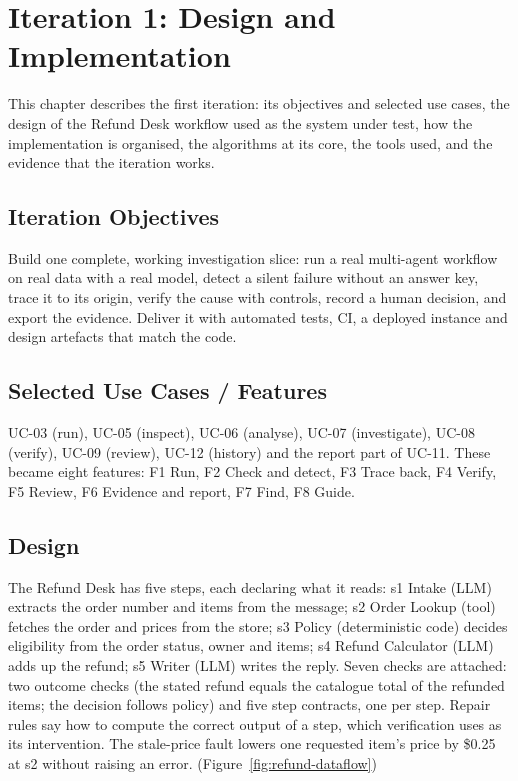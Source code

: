 \chapter{Iteration 1: Design and Implementation}

This chapter describes the first iteration: its objectives and selected use cases, the design of the Refund Desk workflow used as the system under test, how the implementation is organised, the algorithms at its core, the tools used, and the evidence that the iteration works.

\section{Iteration Objectives}

Build one complete, working investigation slice: run a real multi-agent workflow on real data with a real model, detect a silent failure without an answer key, trace it to its origin, verify the cause with controls, record a human decision, and export the evidence. Deliver it with automated tests, CI, a deployed instance and design artefacts that match the code.

\section{Selected Use Cases / Features}

UC-03 (run), UC-05 (inspect), UC-06 (analyse), UC-07 (investigate), UC-08 (verify), UC-09 (review), UC-12 (history) and the report part of UC-11. These became eight features: F1 Run, F2 Check and detect, F3 Trace back, F4 Verify, F5 Review, F6 Evidence and report, F7 Find, F8 Guide.

\section{Design}

The Refund Desk has five steps, each declaring what it reads: s1 Intake (LLM) extracts the order number and items from the message; s2 Order Lookup (tool) fetches the order and prices from the store; s3 Policy (deterministic code) decides eligibility from the order status, owner and items; s4 Refund Calculator (LLM) adds up the refund; s5 Writer (LLM) writes the reply. Seven checks are attached: two outcome checks (the stated refund equals the catalogue total of the refunded items; the decision follows policy) and five step contracts, one per step. Repair rules say how to compute the correct output of a step, which verification uses as its intervention. The stale-price fault lowers one requested item's price by \$0.25 at s2 without raising an error. (Figure~\ref{fig:refund-dataflow})

